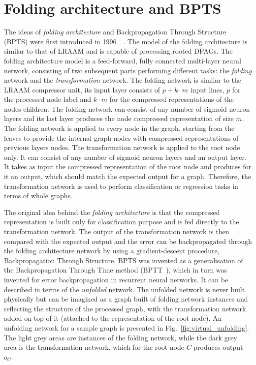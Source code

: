 \section{Folding architecture and BPTS}
The ideas of \emph{folding architecture} and Backpropagation Through Structure (BPTS) were first introduced in 1996~\cite{goller1996learning}~\cite{kuchler1996inductive}. The model of the folding architecture is similar to that of LRAAM and is capable of processing rooted DPAGs. The folding architecture model is a feed-forward, fully connected multi-layer neural network, consisting of two subsequent parts performing different tasks: the \emph{folding} network and the \emph{transformation} network. The folding network is similar to the LRAAM compressor unit, its input layer consists of $p + k \cdot m$ input lines, $p$ for the processed node label and $k \cdot m$ for the compressed representations of the nodes children. The folding network can consist of any number of sigmoid neuron layers and its last layer produces the node compressed representation of size $m$. The folding network is applied to every node in the graph, starting from the leaves to provide the internal graph nodes with compressed representations of previous layers nodes. The transformation network is applied to the root node only. It can consist of any number of sigmoid neuron layers and an output layer. It takes as input the compressed representation of the root node and produces for it an output, which should match the expected output for a graph. Therefore, the transformation network is used to perform classification or regression tasks in terms of whole graphs.

The original idea behind the \emph{folding architecture} is that the compressed representation is built only for classification purpose and is fed directly to the transformation network. The output of the transformation network is then compared with the expected output and the error can be backpropagated through the folding architecture network by using a gradient-descent procedure, Backpropagation Through Structure. BPTS was invented as a generalisation of the Backpropagation Through Time method (BPTT~\cite{pineda1987generalization}), which in turn was invented for error backpropagation in recurrent neural networks. It can be described in terms of the \emph{unfolded} network. The unfolded network is never built physically but can be imagined as a graph built of folding network instances and reflecting the structure of the processed graph, with the transformation network added on top of it (attached to the representation of the root node). An unfolding network for a sample graph is presented in Fig.~\ref{fig:virtual_unfolding}. The light grey areas are instances of the folding network, while the dark grey area is the transformation network, which for the root node $C$ produces output $o_C$.

